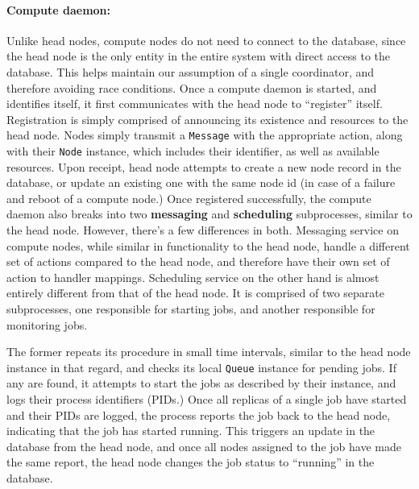 \documentclass[sigconf]{acmart}
\begin{document}
\paragraph{Compute daemon:}
Unlike head nodes, compute nodes do not need to connect to the database, since the head node is the only entity in the entire
system with direct access to the database. This helps maintain our assumption of a single coordinator, and therefore avoiding
race conditions.
Once a compute daemon is started, and identifies itself, it first communicates with the head node to ``register'' itself.
Registration is simply comprised of announcing its existence and resources to the head node.
Nodes simply transmit a \verb|Message| with the appropriate action, along with their \verb|Node| instance, which includes their
identifier, as well as available resources.
Upon receipt, head node attempts to create a new node record in the database, or update an existing one with the same node id
(in case of a failure and reboot of a compute node.)
Once registered successfully, the compute daemon also breaks into two \textbf{messaging} and \textbf{scheduling} subprocesses,
similar to the head node. However, there's a few differences in both.
Messaging service on compute nodes, while similar in functionality to the head node, handle a different set of actions compared
to the head node, and therefore have their own set of action to handler mappings.
Scheduling service on the other hand is almost entirely different from that of the head node.
It is comprised of two separate subprocesses, one responsible for starting jobs, and another responsible for monitoring jobs.

The former repeats its procedure in small time intervals, similar to the head node instance in that regard, and checks its local
\verb|Queue| instance for pending jobs.
If any are found, it attempts to start the jobs as described by their instance, and logs their process identifiers (PIDs.)
Once all replicas of a single job have started and their PIDs are logged, the process reports the job back to the head node,
indicating that the job has started running. This triggers an update in the database from the head node, and once all nodes
assigned to the job have made the same report, the head node changes the job status to ``running'' in the database.
\end{document}
